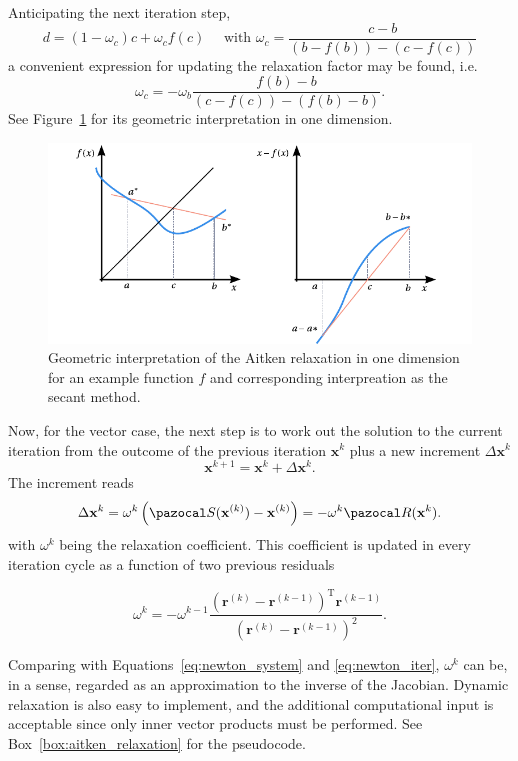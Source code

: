 Anticipating the next iteration step,
\begin{equation}
d=\left(1-\omega_{c}\right) c+\omega_{c} f(c) \quad \text { with } \omega_{c}=\frac{c-b}{\left(b-f(b)\right)-\left(c-f(c)\right)}
\end{equation}
a convenient expression for updating the relaxation factor may be found, i.e.
\begin{equation}
\omega_{c}=-\omega_{b}\frac{f(b)-b}{(c-f(c))-(f(b)-b)}.
\end{equation}
See Figure~\ref{fig:mod_aitken} for its geometric interpretation in one dimension.

\begin{figure}[htbp]
  \includegraphics{figures/mod_aitken}
  \caption{Geometric interpretation of the Aitken relaxation in one dimension for an example function \(f\) and corresponding interpreation as the secant method.}
  \label{fig:mod_aitken}
\end{figure}

Now, for the vector case, the next step is to work out the solution to the current iteration from the outcome of the previous iteration $\mathbf{x}^{k}$ plus a new increment $\Delta \mathbf{x}^{k}$
\begin{equation}
\mathbf{x}^{k+1}=\mathbf{x}^{k}+\Delta \mathbf{x}^{k}.
\end{equation}
The increment reads
\begin{equation} \label{eq:aitken_update}
\Delta \mathbf{x}^{k}=\omega^{k}\left(\pazocal S(\mathbf{x}^{(k)})-\mathbf{x}^{(k)}\right)=-\omega^{k} \pazocal R(\mathbf x^k).
\end{equation}
with $\omega^{k}$ being the relaxation coefficient.
This coefficient is updated in every iteration cycle as a function of two previous residuals
\begin{highlight}
  \begin{equation} \label{eq:aitken_relaxation_factor}
    \omega^{k}=-\omega^{k-1} \frac{\left(\mathbf{r}^{(k)}-\mathbf{r}^{(k-1)}\right)^{\mathrm{T}} \mathbf{r}^{(k-1)}}{\left(\mathbf{r}^{(k)}-\mathbf{r}^{(k-1)}\right)^{2}}.
  \end{equation}
\end{highlight}
Comparing with Equations~\eqref{eq:newton_system} and \eqref{eq:newton_iter}, \(\omega^{k}\) can be, in a sense, regarded as an approximation to the inverse of the Jacobian.
Dynamic relaxation is also easy to implement, and the additional computational input is acceptable since only inner vector products must be performed.
See Box~\ref{box:aitken_relaxation} for the pseudocode.

